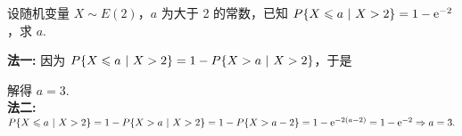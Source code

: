 \begin{example}
    设随机变量 $X\sim E(2)$，$a$ 为大于 2 的常数，已知 $P\qty{X\leqslant a~|~X>2}=1-\mathrm{e}^{-2}$，求 $a.$
\end{example}
\begin{solution}
    \textbf{法一: }因为 $P\qty{X\leqslant a~|~X>2}=1-P\qty{X>a~|~X>2}$，于是
    解得 $a=3.$\\
    \textbf{法二: }$P\qty{X\leqslant a~|~X>2}=1-P\qty{X>a~|~X>2}=1-P\qty{X>a-2}=1-\mathrm{e}^{-2(a-2)}=1-\mathrm{e}^{-2}\Rightarrow a=3.$
\end{solution}

